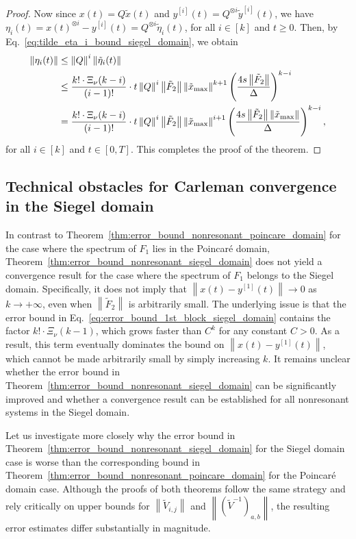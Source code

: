 \documentclass[superscriptaddress,onecolumn,nofootinbib,longbibliography,a4paper,accepted=2026-09-29]{quantumarticle}
\theoremstyle{plain}
\theoremstyle{definition}
\numberwithin{thm}{section}
\numberwithin{assumption}{section}
\numberwithin{lemma}{section}
\numberwithin{prop}{section}
\numberwithin{cor}{section}
\numberwithin{definition}{section}
\numberwithin{rmk}{section}
\numberwithin{equation}{section}
\newcommand{\norm}[1]     {\left\| #1 \right\|}
\newcommand{\lrb}[1]{\left ( #1 \right )}
\begin{document}
\begin{proof}
    Now since $x(t)=Q\tilde{x}(t)$ and $y^{[i]}(t)=Q^{\otimes i} \tilde{y}^{[i]}(t)$, we have ${\eta}_i(t)=x(t)^{\otimes i}-{y}^{[i]}(t)=
    Q^{\otimes i} \tilde{\eta}_i(t)$, for all $i \in [k]$ and $t \ge 0$. Then, by Eq.~\eqref{eq:tilde_eta_i_bound_siegel_domain}, we obtain
    \begin{align}
    \norm{\eta_i(t)}
    &\le \norm{Q}^{i} \norm{\tilde{\eta}_i(t)} \\
    &\le 
    \frac{k! \cdot \Xi_{\nu}(k-i) }{(i-1)!} 
    \cdot t \norm{Q}^i \norm{\tilde{F}_2}  \norm{\tilde{x}_{\rm max}}^{k+1} \lrb{\frac{4 s\norm{\tilde{F}_2}}{\Delta}}^{k-i} \\
    &= \frac{k! \cdot \Xi_{\nu}(k-i) }{(i-1)!}  
    \cdot t \norm{Q}^i \norm{\tilde{F}_2} \norm{\tilde{x}_{\rm max}}^{i+1}\lrb{\frac{4 s\norm{\tilde{F}_2} \norm{\tilde{x}_{\rm max}}}{\Delta}}^{k-i},
    \end{align}
    for all $i \in [k]$ and $t \in [0, T]$. This completes the proof of the theorem.   

\end{proof}

\subsection{Technical obstacles for Carleman convergence in the Siegel domain}

In contrast to Theorem~\ref{thm:error_bound_nonresonant_poincare_domain} for the case where the spectrum of $F_1$ lies in the Poincar\'{e} domain, Theorem~\ref{thm:error_bound_nonresonant_siegel_domain} does not yield a convergence result for the case where the spectrum of $F_1$ belongs to the Siegel domain. Specifically, it does not imply that $\norm{x(t)-y^{[1]}(t)} \to 0$ as $k \to +\infty$, even when $\norm{\tilde{F}_2}$ is arbitrarily small. The underlying issue is that the error bound in  Eq.~\eqref{eq:error_bound_1st_block_siegel_domain} contains the factor $k! \cdot \Xi_{\nu}(k-1)$, which grows faster than $C^k$ for any constant $C>0$. As a result, this term eventually dominates the bound on $\norm{x(t) - y^{[1]}(t)}$, which cannot be made arbitrarily small by simply increasing $k$. It remains unclear whether the error bound in Theorem~\ref{thm:error_bound_nonresonant_siegel_domain} can be significantly improved and whether a convergence result can be established for all nonresonant systems in the Siegel domain.


Let us investigate more closely why the error bound in Theorem~\ref{thm:error_bound_nonresonant_siegel_domain} for the Siegel domain case is worse than the corresponding bound in Theorem~\ref{thm:error_bound_nonresonant_poincare_domain} for the Poincar\'{e} domain case. Although the proofs of both theorems follow the same strategy and rely critically on upper bounds for $\norm{\tilde{V}_{i,j}}$ and $\norm{(\tilde{V}^{-1})_{a,b}}$, the resulting error  estimates differ substantially in magnitude.
\end{document}
